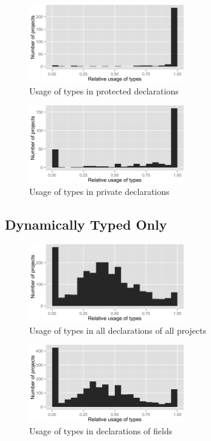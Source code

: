 \begin{figure}[h]
\centering 
\includegraphics[width=0.6\textwidth]{../aosd_2014/analysis/result/background/static-only/histograms/12_Protected.png} 
\caption{Usage of types in protected declarations}
\end{figure}

\begin{figure}[h]
\centering 
\includegraphics[width=0.6\textwidth]{../aosd_2014/analysis/result/background/static-only/histograms/11_Private.png} 
\caption{Usage of types in private declarations}
\end{figure}

\FloatBarrier

\subsection*{Dynamically Typed Only}

\begin{figure}[h]
\centering 
\includegraphics[width=0.6\textwidth]{../aosd_2014/analysis/result/background/dynamic-only/histograms/5_all_types.png} 
\caption{Usage of types in all declarations of all projects}
\end{figure}

\begin{figure}[h]
\centering 
\includegraphics[width=0.6\textwidth]{../aosd_2014/analysis/result/background/dynamic-only/histograms/10_Field.png} 
\caption{Usage of types in declarations of fields}
\end{figure}

